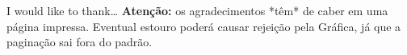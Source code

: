 \documentclass[%
        TwoSidePages,%
        Portuguese,%
        FinalVersion,%
        TablesPage,%
        FiguresPage,%
        ]%
{ic-tese-v2}
\begin{document}

 I would like to thank\ldots
\textbf{Aten\c{c}\~ao:} os agradecimentos *t\^em* de caber em uma p\'agina impressa. Eventual estouro
 poder\'a causar rejei\c{c}\~ao pela Gr\'afica, j\'a que a pagina\c{c}\~ao sai fora do padr\~ao.




    \afterpreface %

\end{document}
